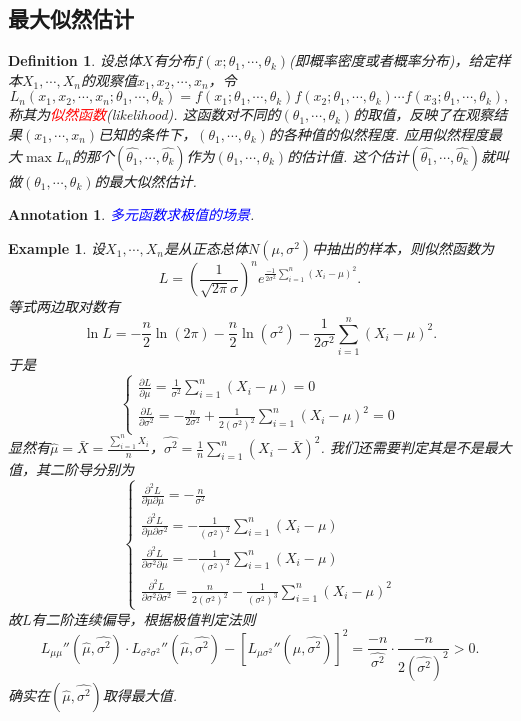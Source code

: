 \documentclass{article}
\newtheorem{example}[theorem]{Example}
\newtheorem{definition}[theorem]{Definition}
\newtheorem{annotation}[theorem]{Annotation}
\newcommand{\redt}[1]{\textcolor{red}{#1}}
\newcommand{\bluet}[1]{\textcolor{blue}{#1}}
\begin{document}
\subsection{最大似然估计}

\begin{definition}
\rm 设总体$X$有分布$f(x;\theta_1,\cdots,\theta_k)$(即概率密度或者概率分布)，给定样本$X_1,\cdots,X_n$的观察值$x_1,x_2,\cdots,x_n$，令
$$
L_n(x_1,x_2,\cdots,x_n;\theta_1,\cdots,\theta_k) = f(x_1;\theta_1,\cdots,\theta_k)f(x_2;\theta_1,\cdots,\theta_k)\cdots f(x_3;\theta_1,\cdots,\theta_k),
$$
称其为\redt{似然函数}(likelihood). 这函数对不同的$(\theta_1,\cdots,\theta_k)$的取值，反映了在观察结果$(x_1,\cdots,x_n)$已知的条件下，$(\theta_1,\cdots,\theta_k)$的各种值的似然程度. 应用似然程度最大$\max{L_n}$的那个$(\widehat{\theta_1},\cdots,\widehat{\theta_k})$作为$(\theta_1,\cdots,\theta_k)$的估计值. 这个估计$(\widehat{\theta_1},\cdots,\widehat{\theta_k})$就叫做$(\theta_1,\cdots,\theta_k)$的最大似然估计. 
\end{definition}

\begin{annotation}
\rm \bluet{多元函数求极值的场景}.
\end{annotation}

\begin{example}
\rm 设$X_1,\cdots,X_n$是从正态总体$N(\mu,\sigma^2)$中抽出的样本，则似然函数为
$$
L = \left(\frac{1}{\sqrt{2\pi}\sigma}\right)^ne^{\frac{-1}{2\sigma^2}\sum\limits_{i =1}^n (X_i-\mu)^2}.
$$
等式两边取对数有
$$
\ln L =-\frac{n}{2}\ln(2\pi)-\frac{n}{2}\ln(\sigma^2) - \frac{1}{2\sigma^2}\sum\limits_{i =1}^n (X_i-\mu)^2.
$$
于是
$$
\left\{
\begin{array}{ll}
\frac{\partial L}{\partial \mu} = \frac{1}{\sigma^2}\sum\limits_{i =1}^n (X_i-\mu) = 0 \\
\frac{\partial L}{\partial \sigma^2} = - \frac{n}{2\sigma^2} +\frac{1}{2(\sigma^2)^2} \sum\limits_{i =1}^n (X_i-\mu)^2 = 0
\end{array}\right.
$$
显然有$\widehat{\mu} = \bar{X} = \frac{\sum\limits_{i =1}^n X_i}{n}$，$\widehat{\sigma^2} = \frac{1}{n}\sum\limits_{i =1}^n (X_i-\bar{X})^2$. 我们还需要判定其是不是最大值，其二阶导分别为
$$
\left\{
\begin{array}{ll}
\frac{\partial^2L}{\partial \mu\partial \mu} = -\frac{n}{\sigma^2} \\
\frac{\partial^2L}{\partial \mu \partial \sigma^2} =  -\frac{1}{(\sigma^2)^2}\sum\limits_{i =1}^n (X_i-\mu) \\
\frac{\partial^2L}{\partial \sigma^2 \partial \mu} = -\frac{1}{(\sigma^2)^2}\sum\limits_{i =1}^n (X_i-\mu) \\
\frac{\partial^2L}{\partial \sigma^2 \partial \sigma^2} =  \frac{n}{2(\sigma^2)^2} - \frac{1}{(\sigma^2)^3}\sum\limits_{i =1}^n (X_i-\mu)^2
\end{array}\right.
$$
故$L$有二阶连续偏导，根据极值判定法则
$$
L_{\mu\mu}''(\widehat{\mu},\widehat{\sigma^2})\cdot L_{\sigma^2\sigma^2}''(\widehat{\mu},\widehat{\sigma^2}) - \left[L_{\mu\sigma^2}''(\widehat{\mu},\widehat{\sigma^2})\right]^2 = \frac{-n}{\widehat{\sigma^2}}\cdot\frac{-n}{2(\widehat{\sigma^2})^2} > 0.
$$
确实在$(\widehat{\mu},\widehat{\sigma^2})$取得最大值.
\end{example}
\end{document}
